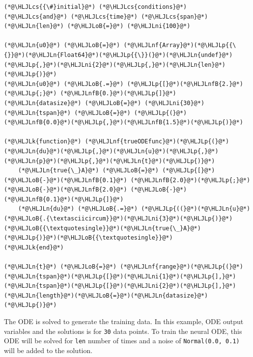 \documentclass[12pt,a4paper]{article}
\newcommand{\HLJLk}[1]{\textcolor[RGB]{148,91,176}{\textbf{#1}}}
\newcommand{\HLJLn}[1]{#1}
\newcommand{\HLJLnf}[1]{\textcolor[RGB]{66,102,213}{#1}}
\newcommand{\HLJLnfB}[1]{\textcolor[RGB]{59,151,46}{#1}}
\newcommand{\HLJLni}[1]{\textcolor[RGB]{59,151,46}{#1}}
\newcommand{\HLJLoB}[1]{\textcolor[RGB]{102,102,102}{\textbf{#1}}}
\newcommand{\HLJLp}[1]{#1}
\newcommand{\HLJLcs}[1]{\textcolor[RGB]{153,153,119}{\textit{#1}}}
\begin{document}
\begin{lstlisting}
(*@\HLJLcs{{\#}initial}@*) (*@\HLJLcs{conditions}@*) (*@\HLJLcs{and}@*) (*@\HLJLcs{time}@*) (*@\HLJLcs{span}@*)
(*@\HLJLn{len}@*) (*@\HLJLoB{=}@*) (*@\HLJLni{100}@*)

(*@\HLJLn{u0}@*) (*@\HLJLoB{=}@*) (*@\HLJLnf{Array}@*)(*@\HLJLp{{\{}}@*)(*@\HLJLn{Float64}@*)(*@\HLJLp{{\}}(}@*)(*@\HLJLn{undef}@*)(*@\HLJLp{,}@*)(*@\HLJLni{2}@*)(*@\HLJLp{,}@*)(*@\HLJLn{len}@*)(*@\HLJLp{)}@*)
(*@\HLJLn{u0}@*) (*@\HLJLoB{.=}@*) (*@\HLJLp{[}@*)(*@\HLJLnfB{2.}@*)(*@\HLJLp{;}@*) (*@\HLJLnfB{0.}@*)(*@\HLJLp{]}@*)
(*@\HLJLn{datasize}@*) (*@\HLJLoB{=}@*) (*@\HLJLni{30}@*)
(*@\HLJLn{tspan}@*) (*@\HLJLoB{=}@*) (*@\HLJLp{(}@*)(*@\HLJLnfB{0.0}@*)(*@\HLJLp{,}@*)(*@\HLJLnfB{1.5}@*)(*@\HLJLp{)}@*)

(*@\HLJLk{function}@*) (*@\HLJLnf{trueODEfunc}@*)(*@\HLJLp{(}@*)(*@\HLJLn{du}@*)(*@\HLJLp{,}@*)(*@\HLJLn{u}@*)(*@\HLJLp{,}@*)(*@\HLJLn{p}@*)(*@\HLJLp{,}@*)(*@\HLJLn{t}@*)(*@\HLJLp{)}@*)
    (*@\HLJLn{true{\_}A}@*) (*@\HLJLoB{=}@*) (*@\HLJLp{[}@*)(*@\HLJLoB{-}@*)(*@\HLJLnfB{0.1}@*) (*@\HLJLnfB{2.0}@*)(*@\HLJLp{;}@*) (*@\HLJLoB{-}@*)(*@\HLJLnfB{2.0}@*) (*@\HLJLoB{-}@*)(*@\HLJLnfB{0.1}@*)(*@\HLJLp{]}@*)
    (*@\HLJLn{du}@*) (*@\HLJLoB{.=}@*) (*@\HLJLp{((}@*)(*@\HLJLn{u}@*)(*@\HLJLoB{.{\textasciicircum}}@*)(*@\HLJLni{3}@*)(*@\HLJLp{)}@*)(*@\HLJLoB{{\textquotesingle}}@*)(*@\HLJLn{true{\_}A}@*)(*@\HLJLp{)}@*)(*@\HLJLoB{{\textquotesingle}}@*)
(*@\HLJLk{end}@*)

(*@\HLJLn{t}@*) (*@\HLJLoB{=}@*) (*@\HLJLnf{range}@*)(*@\HLJLp{(}@*)(*@\HLJLn{tspan}@*)(*@\HLJLp{[}@*)(*@\HLJLni{1}@*)(*@\HLJLp{],}@*)(*@\HLJLn{tspan}@*)(*@\HLJLp{[}@*)(*@\HLJLni{2}@*)(*@\HLJLp{],}@*)(*@\HLJLn{length}@*)(*@\HLJLoB{=}@*)(*@\HLJLn{datasize}@*)(*@\HLJLp{)}@*)
\end{lstlisting}

The ODE is solved to generate the training data. In this example, ODE output variables and the solutions is  for \texttt{30} data points. To train the neural ODE, this ODE will be solved for \texttt{len} number of times and a noise of \texttt{Normal(0.0, 0.1)} will be added to the solution.
\end{document}
